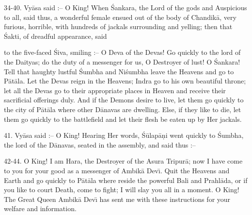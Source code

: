 34-40. Vy\=asa said :-- O King! When \'Sankara, the Lord of the gods and Auspicious to all, said thus, a wonderful female ensued out of the body of Chandik\=a, very furious, horrible, with hundreds of jackals surrounding and yelling; then that \'Sakti, of dreadful appearance, said

to the five-faced \'Siva, smiling :-- O Deva of the Devas! Go quickly to the lord of the Daityas; do the duty of a messenger for us, O Destroyer of lust! O \'Sankara! Tell that haughty lustful \'Sumbha and Ni\'sumbha leave the Heavens and go to P\=at\=ala. Let the Devas reign in the Heavens; Indra go to his own beautiful throne; let all the Devas go to their appropriate places in Heaven and receive their sacrificial offerings duly. And if the Demons desire to live, let them go quickly to the city of P\=at\=ala where other D\=anavas are dwelling. Else, if they like to die, let them go quickly to the battlefield and let their flesh be eaten up by Her jackals.

41. Vy\=asa said :-- O King! Hearing Her words, \'S\=ulap\=a\d{n}i went quickly to \'Sumbha, the lord of the D\=anavas, seated in the assembly, and said thus :--

42-44. O King! I am Hara, the Destroyer of the Asura Tripur\=a; now I have come to you for your good as a messenger of Ambik\=a Dev\={\i}. Quit the Heavens and Earth and go quickly to P\=at\=ala where reside the powerful Bali and Prahl\=ada, or if you like to court Death, come to fight; I will slay you all in a moment. O King! The Great Queen Ambik\=a Dev\={\i} has sent me with these instructions for your welfare and information.

